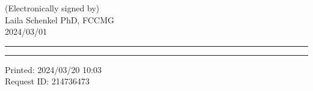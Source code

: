 \documentclass[9pt]{extarticle}
\begin{document}
(Electronically signed by) \\
Laila Schenkel PhD, FCCMG \\
2024/03/01

\vspace{1em}
\hrule
\vspace{1pt}
\hrule
\vspace{1em}

Printed: 2024/03/20 10:03\\
Request ID: 214736473
\end{document}
